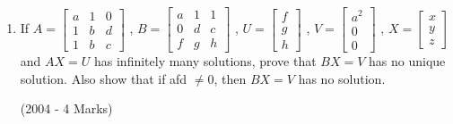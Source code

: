\documentclass[journal,12pt,twocolumn]{IEEEtran}
\theoremstyle{remark}
\begin{document}
\begin{enumerate}
	\item If $A = \begin{bmatrix}
			a & 1 & 0 \\
			1 & b & d \\
			1 & b & c \end{bmatrix}$ ,
		$B = \begin{bmatrix}
			a & 1 & 1 \\
			0 & d & c \\
			f & g & h \end{bmatrix}$ ,
		$U = \begin{bmatrix}
			f \\
			g \\
			h \end{bmatrix}$ ,
		$V = \begin{bmatrix}
			a^2 \\
			0 \\
			0 \end{bmatrix}$ ,
		$X = \begin{bmatrix}
			x \\
			y \\
			z \end{bmatrix}$
		and $AX=U$ has infinitely many solutions, prove that $BX=V$ has no unique solution. Also show that if afd $\neq0$, then $BX=V$ has no solution.

		\hfill(2004 - 4 Marks)
\end{enumerate}

\onecolumn
\end{document}
